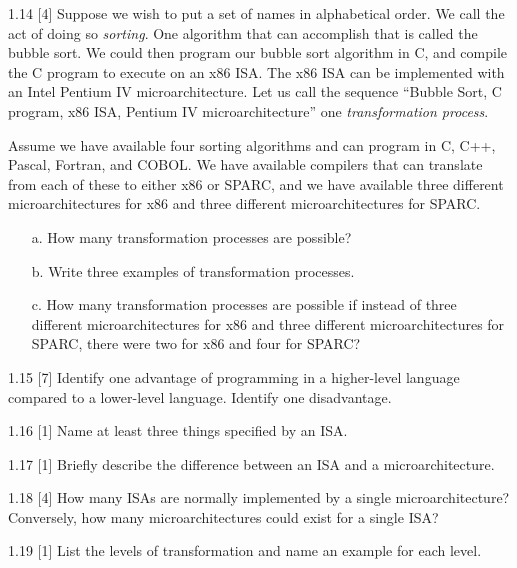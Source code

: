 \documentclass{patt}
\begin{document}
\begin{exercises}
\smallskip

\item[1.14]
[4] Suppose we wish to put a set of names in alphabetical order. We
call the act of doing so {\em sorting}. One algorithm that can
accomplish that is called the bubble sort. We could then program
our bubble sort algorithm in C, and compile the C program to
execute on an x86 ISA. The x86 ISA can be implemented with an
Intel Pentium IV microarchitecture. Let us call the sequence
``Bubble Sort, C program, x86 ISA, Pentium IV microarchitecture''
one {\em transformation process}.

\hspace*{18pt}Assume we have available four sorting algorithms and can program
in C, C++, Pascal, Fortran, and COBOL. We have available compilers
that can translate from each of these to either x86 or SPARC, and
we have available three different microarchitectures for x86 and
three different microarchitectures for SPARC.

\begin{enumerate}
        \item[a.] How many transformation processes are possible?
        \item[b.] Write three examples of transformation processes.
        \item[c.] How many transformation processes are possible if
instead of three different microarchitectures for x86 and three
different microarchitectures for SPARC, there were two for x86
and four for SPARC?
\end{enumerate}

\smallskip

\item[1.15]
[7] Identify one advantage of programming in a higher-level language compared to
a lower-level language. Identify one disadvantage.

\smallskip

\item[1.16]
[1] Name at least three things specified by an ISA.

\smallskip

\item[1.17]
[1] Briefly describe the difference between an ISA and a microarchitecture.

\item[1.18]
[4] How many ISAs are normally implemented by a single
microarchitecture? Conversely, how many microarchitectures
could exist for a single ISA?

\item[1.19]
[1] List the levels of transformation and name an example for each level.


\end{exercises}
\end{document}
